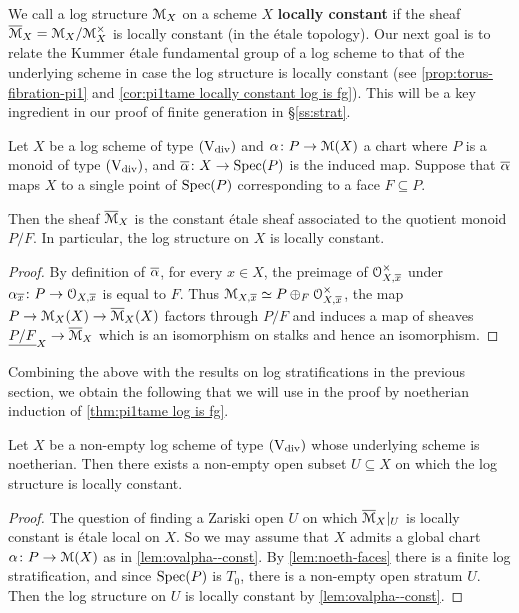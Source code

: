 We call a log structure ${\mathcal M}_X$ on a scheme $X$ {\bf locally constant} if the sheaf $\overline{{\mathcal M}}_X = {\mathcal M}_X/{\mathcal M}_X^\times$ is locally constant (in the \'etale topology). Our next goal is to relate the Kummer \'etale fundamental group of a log scheme to that of the underlying scheme in case the log structure is locally constant (see \cref{prop:torus-fibration-pi1} and \cref{cor:pi1tame locally constant log is fg}). This will be a key ingredient in our proof of finite generation in \S\ref{ss:strat}.

\begin{lem} \label{lem:ovalpha--const}
    Let $X$ be a log scheme of type $(\mathrm{V}_{\rm div})$ and $\alpha\colon P\to {\mathcal M}(X)$ a chart where $P$ is a monoid of type $(\mathrm{V}_{\rm div})$, and $\overline{\alpha}\colon X\to \operatorname{Spec}(P)$ is the induced map. Suppose that $\overline{\alpha}$ maps $X$ to a single point of $\operatorname{Spec}(P)$ corresponding to a face $F\subseteq P$. 
    
    Then the sheaf $\overline{{\mathcal M}}_X$ is the constant \'etale sheaf associated to the quotient monoid $P/F$. In particular, the log structure on $X$ is locally constant. 
\end{lem}

\begin{proof}
By definition of $\overline{\alpha}$, for every $x\in X$, the preimage of ${\mathcal O}_{X,\overline{x}}^\times$ under $\alpha_{\overline{x}}\colon P\to {\mathcal O}_{X,\overline{x}}$ is equal to $F$. Thus ${\mathcal M}_{X,\overline{x}} \simeq P\oplus_F {\mathcal O}_{X,\overline{x}}^\times$, the map $P\to {\mathcal M}_X(X)\to \overline{{\mathcal M}}_X(X)$ factors through $P/F$ and induces a map of sheaves $\underline{P/F}_X\to \overline{{\mathcal M}}_X$ which is an isomorphism on stalks and hence an isomorphism. 
\end{proof}

Combining the above with the results on log stratifications in the previous section, we obtain the following that we will use in the proof by noetherian induction of \cref{thm:pi1tame log is fg}.

\begin{cor} \label{cor:generically-log-constant}
    Let $X$ be a non-empty log scheme of type $(\mathrm{V}_{\rm div})$ whose underlying scheme is noetherian. Then there exists a non-empty open subset $U\subseteq X$ on which the log structure is locally constant. 
\end{cor}
\begin{proof}
    The question of finding a Zariski open $U$ on which $\overline{{\mathcal M}}_X|_U$ is locally constant is \'etale local on $X$. So we may assume that $X$ admits a global chart $\alpha\colon P\to {\mathcal M}(X)$ as in \cref{lem:ovalpha--const}.
    By \cref{lem:noeth-faces} there is a finite log stratification, and since $\operatorname{Spec}(P)$ is $T_0$, there is a non-empty open stratum $U$. 
    Then the log structure on $U$ is locally constant by \cref{lem:ovalpha--const}.
\end{proof}

